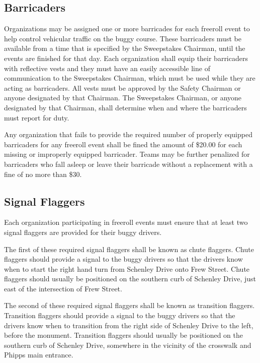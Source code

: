 \subsection{Barricaders}
\label{subsec:Barricaders}

	Organizations may be assigned one or more barricades for each freeroll event to help control vehicular traffic on the buggy course. These barricaders must be available from a time that is specified by the Sweepstakes Chairman, until the events are finished for that day. Each organization shall equip their barricaders with reflective vests and they must have an easily accessible line of communication to the Sweepstakes Chairman, which must be used while they are acting as barricaders. All vests must be approved by the Safety Chairman or anyone designated by that Chairman. The Sweepstakes Chairman, or anyone designated by that Chairman, shall determine when and where the barricaders must report for duty.

	Any organization that fails to provide the required number of properly equipped barricaders for any freeroll event shall be fined the amount of \$20.00 for each missing or improperly equipped barricader. Teams may be further penalized for barricaders who fall asleep or leave their barricade without a replacement with a fine of no more than \$30. 
	
\subsection{Signal Flaggers}
\label{subsec:Flaggers}

	Each organization participating in freeroll events must ensure that at least two signal flaggers are provided for their buggy drivers.

	The first of these required signal flaggers shall be known as chute flaggers. Chute flaggers should provide a signal to the buggy drivers so that the drivers know when to start the right hand turn from Schenley Drive onto Frew Street. Chute flaggers should usually be positioned on the southern curb of Schenley Drive, just east of the intersection of Frew Street.

	The second of these required signal flaggers shall be known as transition flaggers. Transition flaggers should provide a signal to the buggy drivers so that the drivers know when to transition from the right side of Schenley Drive to the left, before the monument. Transition flaggers should usually be positioned on the southern curb of Schenley Drive, somewhere in the vicinity of the crosswalk and Phipps main entrance.

